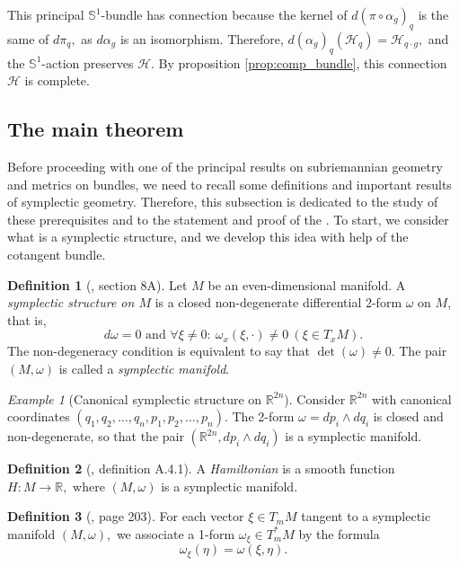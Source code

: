 \documentclass[12pt, letterpaper, reqno]{amsart}
\theoremstyle{definition}
\newtheorem{df}{Definition}
\theoremstyle{plain}
\theoremstyle{remark}
\newtheorem{ex}{Example}
\begin{document}
	This principal $ \mathbb{S}^1$-bundle has connection because the kernel of $ d(\pi\circ \alpha_g)_q $ is the same of $ d\pi_q, $ as $ d\alpha_g $ is an isomorphism. Therefore, $ d(\alpha_g)_q ( \mathcal{H}_q) = \mathcal{H}_{q\cdot g}, $ and the $ \mathbb{S}^1 $-action preserves $ \mathcal{H}. $ By proposition \ref{prop:comp_bundle}, this connection $ \mathcal{H} $ is complete.  
 
\subsection{The main theorem}
Before proceeding with one of the principal results on subriemannian geometry and metrics on bundles, we need to recall some definitions and important results of symplectic geometry. Therefore, this subsection is dedicated to the study of these prerequisites and to the statement and proof of the . To start, we consider what is a symplectic structure, and we develop this idea with help of the cotangent bundle.
\begin{df}[\cite{arnol2013mathematical}, section 8A]
	Let $ M $ be an even-dimensional manifold. A \textit{symplectic structure on $ M $ } is a closed non-degenerate differential 2-form $ \omega $ on $ M $, that is, 
	$$ d\omega=0 \text{ and } \forall \xi \neq 0: \ \omega_x(\xi,\cdot)\neq0 \ (\xi\in T_x M).$$ 
	The non-degeneracy condition is equivalent to say that $ \operatorname{det}(\omega)\neq0 $. The pair $ (M,\omega) $ is called a \textit{symplectic manifold}. 
\end{df}

\begin{ex}[Canonical symplectic structure on $ \mathbb{R}^{2n}$]
	Consider $ \mathbb{R}^{2n} $ with canonical coordinates $ (q_1,q_2,\dots,q_n,p_1,p_2,\dots,p_n) $. The 2-form $ \omega = dp_i\wedge dq_i $ is closed and non-degenerate, so that the pair $ ( \mathbb{R}^{2n}, dp_i\wedge dq_i) $ is a symplectic manifold.  
\end{ex}

\begin{df}[\cite{montgomery2002tour}, definition A.4.1]
	A \textit{Hamiltonian} is a smooth function $ H: M \rightarrow \mathbb{R}, $ where $ (M,\omega) $ is a symplectic manifold.
\end{df}

\begin{df}[\cite{arnol2013mathematical}, page 203]
	For each vector $ \xi\in T_mM  $ tangent to a symplectic manifold $ (M,\omega), $ we associate a 1-form $ \omega_\xi\in T^*_mM $ by the formula $$ \omega_\xi(\eta)=\omega(\xi,\eta). $$  
\end{df}
\end{document}
